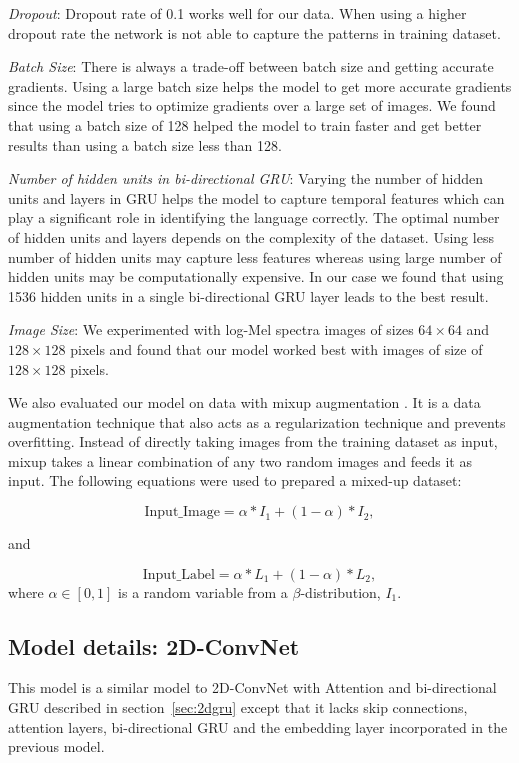 \documentclass[runningheads]{llncs}
\begin{document}
 \emph{Dropout}: Dropout rate of 0.1 works well for our data. When using a higher dropout rate the network is not able to capture the patterns in training dataset.

 \emph{Batch Size}: There is always a trade-off between batch size and getting accurate gradients. Using a large batch size helps the model to get more accurate gradients since the model tries to optimize gradients over a large set of images. We found that using a batch size of 128 helped the model to train faster and get better results than using a batch size less than 128. 

 \emph{Number of hidden units in bi-directional GRU}: Varying the number of hidden units and layers in GRU helps the model to capture temporal features which can play a significant role in identifying the language correctly. The optimal number of hidden units and layers depends on the complexity of the dataset. Using less number of hidden units may capture less features whereas using large number of hidden units may be computationally expensive. In our case we found that using 1536 hidden units in a single bi-directional GRU layer leads to the best result.

 \emph{Image Size}: We experimented with log-Mel spectra images of sizes $64 \times 64$ and $128 \times 128$ pixels and found that our model worked best with images of size of $128 \times 128$ pixels.

\vspace{5mm}
We also evaluated our model on data with mixup augmentation \cite{zhang2017mixup}. It is a data augmentation technique that also acts as a regularization technique and prevents overfitting. Instead of directly taking images from the training dataset as input, mixup takes a linear combination of any two random images and feeds it as input. The following equations were used to prepared a mixed-up dataset:

\begin{equation}
	\mathrm{Input\_Image} = \alpha * I_1 + (1 - \alpha) * I_2,
\end{equation}

and

\begin{equation}
	\mathrm{Input\_Label}	= \alpha * L_1 + (1 - \alpha) * L_2,
\end{equation}
where $\alpha \in [0, 1]$ is a random variable from a $\beta$-distribution, $I_1$.



\subsection{Model details: 2D-ConvNet}
\label{sec:2dcnn}
This model is a similar model to 2D-ConvNet with Attention and bi-directional GRU described in section~\ref{sec:2dgru} except that it lacks skip connections, attention layers, bi-directional GRU and the embedding layer incorporated in the previous model. 
\end{document}
